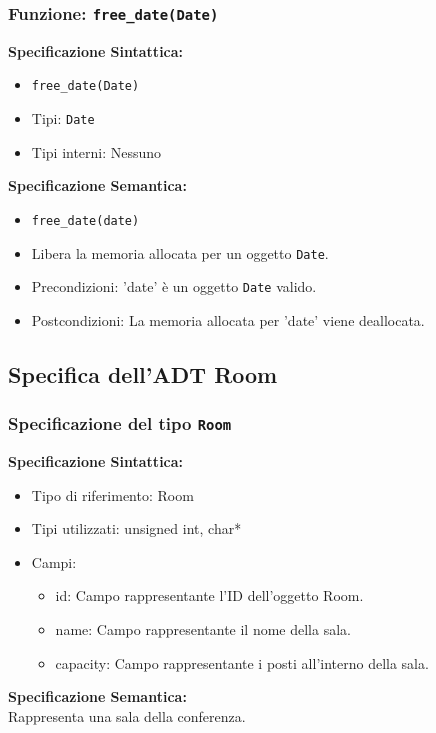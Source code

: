 \documentclass[11pt]{scrartcl} %
\begin{document}
\subsubsection{Funzione: \texttt{free\_date(Date)}}

\textbf{Specificazione Sintattica:}
\begin{itemize}
	\item \texttt{free\_date(Date)}
	\item Tipi: \texttt{Date}
	\item Tipi interni: Nessuno
\end{itemize}

\textbf{Specificazione Semantica:}
\begin{itemize}
	\item \texttt{free\_date(date)}
	\item Libera la memoria allocata per un oggetto \texttt{Date}.
	\item Precondizioni: 'date' è un oggetto \texttt{Date} valido.
	\item Postcondizioni: La memoria allocata per 'date' viene deallocata.
\end{itemize}

\subsection{Specifica dell'ADT Room}

\subsubsection{Specificazione del tipo \texttt{Room}}


\textbf{Specificazione Sintattica:}
\begin{itemize}
	\item Tipo di riferimento: Room
	\item Tipi utilizzati: unsigned int, char*
	\item Campi:
	      \begin{itemize}
		      \item id: Campo rappresentante l'ID dell'oggetto Room.
		      \item name: Campo rappresentante il nome della sala.
		      \item capacity: Campo rappresentante i posti all'interno della sala.

	      \end{itemize}
\end{itemize}
\textbf{Specificazione Semantica:} \\
Rappresenta una sala della conferenza.
\end{document}
